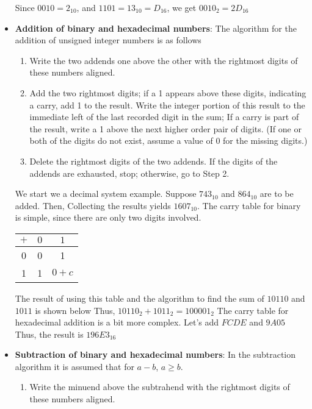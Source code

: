 \documentclass{report}
\begin{document}
\begin{itemize}
            Since $0010 =2_{10}$, and $1101 = 13_{10} = D_{16}$, we get $0010_{2} = 2D_{16} $
        \item \textbf{Addition of binary and hexadecimal numbers}: The algorithm for the addition of unsigned integer numbers is as follows
            \begin{enumerate}
                \item Write the two addends one above the other with the rightmost digits of these numbers aligned.
                \item Add the two rightmost digits; if a 1 appears above these digits, indicating a carry, add 1 to the result. Write the integer portion of this result to the immediate left of the last recorded digit in the sum; If a carry is part of the result, write a 1 above the next higher order pair of digits. (If one or both of the digits do not exist, assume a value of 0 for the missing digits.)
                \item Delete the rightmost digits of the two addends. If the digits of the addends are exhausted, stop; otherwise, go to Step 2.
            \end{enumerate}
            We start we a decimal system example. Suppose $743_{10}$ and  $864_{10}$ are to be added. Then,
            \bigbreak \noindent 
            \bigbreak \noindent 
            Collecting the results yields $1607_{10}$. The carry table for binary is simple, since there are only two digits involved.
            \begin{center}
                \begin{tabular}{c|c|c}
                    $+$ & $0$ & $1$ \\
                    \hline
                    0 & 0 & 1 \\
                    \hline
                    1 & 1 & $0+c$
                \end{tabular}
            \end{center}
            The result of using this table and the algorithm to find the sum of $10110$ and $1011$ is shown below
            \bigbreak \noindent 
            \bigbreak \noindent 
            Thus, $10110_{2} + 1011_{2} = 100001_{2} $
            \bigbreak \noindent 
            The carry table for hexadecimal addition is a bit more complex.
            \bigbreak \noindent 
            \bigbreak \noindent 
            Let's add $FCDE$ and $9A05 $
            \bigbreak \noindent 
            \bigbreak \noindent 
            Thus, the result is $196E3_{16} $
        \item \textbf{Subtraction of binary and hexadecimal numbers}: In the subtraction algorithm it is assumed that for $a-b$, $a \geq b$.
            \begin{enumerate}
                \item Write the minuend above the subtrahend with the rightmost digits of these numbers aligned.


\end{enumerate}
\end{itemize}
\end{document}
